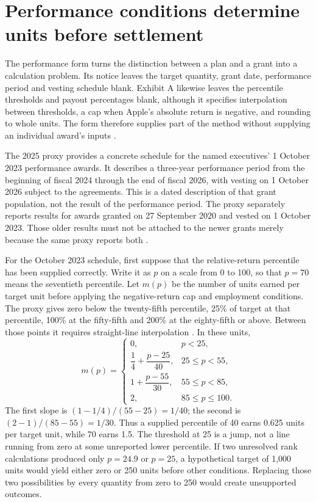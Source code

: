 \section{Performance conditions determine units before settlement}
\label{sec:apple-performance-award}

The performance form turns the distinction between a plan and a grant into a
calculation problem. Its notice leaves the target quantity, grant date,
performance period and vesting schedule blank. Exhibit A likewise leaves the
percentile thresholds and payout percentages blank, although it specifies
interpolation between thresholds, a cap when Apple's absolute return is
negative, and rounding to whole units. The form therefore supplies part of
the method without supplying an individual award's inputs
\citep[Exhibit 10.3, notice and Exhibit A]{apple2022plan}.

The 2025 proxy provides a concrete schedule for the named executives'
1 October 2023 performance awards. It describes a three-year performance
period from the beginning of fiscal 2024 through the end of fiscal 2026, with
vesting on 1 October 2026 subject to the agreements. This is a dated
description of that grant population, not the result of the performance
period. The proxy separately reports results for awards granted on
27 September 2020 and vested on 1 October 2023. Those older results must not
be attached to the newer grants merely because the same proxy reports both
\citep[printed pp.~51--53]{apple2025proxy}.

For the October 2023 schedule, first suppose that the relative-return
percentile has been supplied correctly. Write it as $p$ on a scale from 0 to
100, so that $p=70$ means the seventieth percentile. Let $m(p)$ be the number
of units earned per target unit before applying the negative-return cap and
employment conditions. The proxy gives zero below the twenty-fifth percentile,
25\% of target at that percentile, 100\% at the fifty-fifth and 200\% at the
eighty-fifth or above. Between those points it requires straight-line
interpolation \citep[printed p.~52]{apple2025proxy}. In these units,
\[
 m(p)=\begin{cases}
 0, & p<25,\\[4pt]
 \dfrac14+\dfrac{p-25}{40}, & 25\leq p<55,\\[7pt]
 1+\dfrac{p-55}{30}, & 55\leq p<85,\\[7pt]
 2, & 85\leq p\leq100.
 \end{cases}
\]
The first slope is $(1-1/4)/(55-25)=1/40$; the second is
$(2-1)/(85-55)=1/30$. Thus a supplied percentile of 40 earns 0.625 units per
target unit, while 70 earns 1.5. The threshold at 25 is a jump, not a line
running from zero at some unreported lower percentile. If two unresolved
rank calculations produced only $p=24.9$ or $p=25$, a hypothetical target of
1,000 units would yield either zero or 250 units before other conditions.
Replacing those two possibilities by every quantity from zero to 250 would
create unsupported outcomes.

